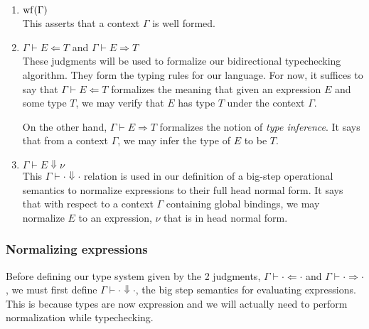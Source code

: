 \documentclass{article}
\begin{document}
\begin{enumerate}
\item $\operatorname{wf}(\Gamma)$ \\
  This asserts that a context $\Gamma$ is well formed.

\item $\Gamma \vdash E \Leftarrow T$ and $\Gamma \vdash E \Rightarrow T$ \\
  These judgments will be used to formalize our bidirectional typechecking
  algorithm. They form the typing rules for our language.
  For now, it suffices to say that $\Gamma \vdash E \Leftarrow T$ formalizes the
  meaning that given an expression $E$ and some type $T$, we may verify that
  $E$ has type $T$ under the context $\Gamma$.

  On the other hand, $\Gamma \vdash E \Rightarrow T$ formalizes the notion of
  \textit{type inference}. It says that from a context $\Gamma$, we may infer
  the type of $E$ to be $T$.

\item $\Gamma \vdash E \Downarrow \nu$ \\
  This $\Gamma \vdash \cdot \Downarrow \cdot$ relation is used in our definition of a
  big-step operational semantics to normalize expressions to their full head
  normal form.
  It says that with respect to a context $\Gamma$ containing global bindings, we
  may normalize $E$ to an expression, $\nu$ that is in head normal form.
\end{enumerate}

\subsubsection{Normalizing expressions}
Before defining our type system given by the 2 judgments,
$\Gamma \vdash \cdot \Leftarrow \cdot$ and $\Gamma \vdash \cdot \Rightarrow
\cdot$, we must first define $\Gamma \vdash \cdot \Downarrow \cdot$, the big
step semantics for evaluating expressions. This is because types are now
expression and we will actually need to perform normalization while
typechecking.
\end{document}
